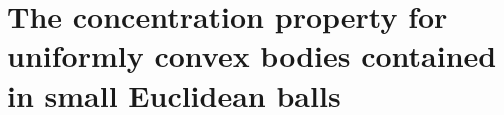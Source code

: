 \chapter[Concentration for uniformely\ldots]{The concentration property 
for uniformly convex bodies contained in small Euclidean balls}

\endinput
